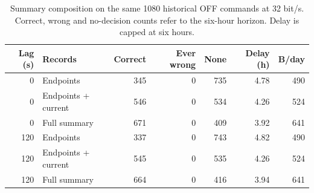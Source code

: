 \begin{table}[!htb]\centering\small
\caption{Summary composition on the same 1080 historical OFF commands at 32 bit/s. Correct, wrong and no-decision counts refer to the six-hour horizon. Delay is capped at six hours.}\label{tab:ablation}
\begin{tabular}{@{}rlrrrrr@{}}\toprule
Lag (s) & Records & Correct & Ever wrong & None & Delay (h) & B/day\\\midrule
0 & Endpoints & 345 & 0 & 735 & 4.78 & 490\\
0 & Endpoints + current & 546 & 0 & 534 & 4.26 & 524\\
0 & Full summary & 671 & 0 & 409 & 3.92 & 641\\
120 & Endpoints & 337 & 0 & 743 & 4.82 & 490\\
120 & Endpoints + current & 545 & 0 & 535 & 4.26 & 524\\
120 & Full summary & 664 & 0 & 416 & 3.94 & 641\\
\bottomrule\end{tabular}\end{table}

